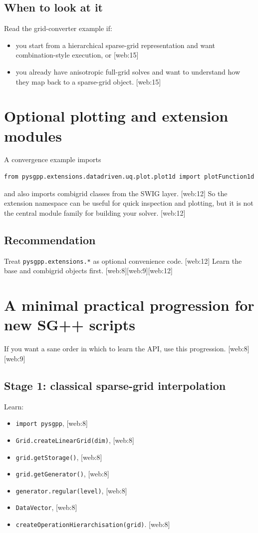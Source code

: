 \documentclass[11pt,a4paper]{article}
\begin{document}
\subsection{When to look at it}
Read the grid-converter example if:
\begin{itemize}[leftmargin=1.5em]
\item you start from a hierarchical sparse-grid representation and want combination-style execution, or [web:15]
\item you already have anisotropic full-grid solves and want to understand how they map back to a sparse-grid object. [web:15]
\end{itemize}

\section{Optional plotting and extension modules}

A convergence example imports
\begin{lstlisting}[style=py]
from pysgpp.extensions.datadriven.uq.plot.plot1d import plotFunction1d
\end{lstlisting}
and also imports combigrid classes from the SWIG layer. [web:12]  
So the extension namespace can be useful for quick inspection and plotting, but it is not the central module family for building your solver. [web:12]  

\subsection{Recommendation}
Treat \texttt{pysgpp.extensions.*} as optional convenience code. [web:12]  
Learn the base and combigrid objects first. [web:8][web:9][web:12]  

\section{A minimal practical progression for new SG++ scripts}

If you want a sane order in which to learn the API, use this progression. [web:8][web:9]

\subsection*{Stage 1: classical sparse-grid interpolation}
Learn:
\begin{itemize}[leftmargin=1.5em]
\item \texttt{import pysgpp}, [web:8]
\item \texttt{Grid.createLinearGrid(dim)}, [web:8]
\item \texttt{grid.getStorage()}, [web:8]
\item \texttt{grid.getGenerator()}, [web:8]
\item \texttt{generator.regular(level)}, [web:8]
\item \texttt{DataVector}, [web:8]
\item \texttt{createOperationHierarchisation(grid)}. [web:8]
\end{itemize}
\end{document}
